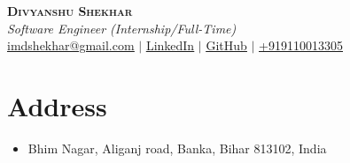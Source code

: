 \documentclass[letterpaper,11pt]{article}
\makeatletter
\newcommand{\resumeItem}[1]{
  \item\small{
    {#1 \vspace{-2pt}}
  }
}
\newcommand{\resumeSubheading}[4]{
  \vspace{-2pt}\item
    \begin{tabular*}{0.97\textwidth}[t]{l@{\extracolsep{\fill}}r}
      \textbf{#1} & #2 \\
      \textit{\small#3} & \textit{\small #4} \\
    \end{tabular*}\vspace{-7pt}
}
\newcommand{\resumeSubSubheading}[2]{
    \item
    \begin{tabular*}{0.97\textwidth}{l@{\extracolsep{\fill}}r}
      \textit{\small#1} & \textit{\small #2} \\
    \end{tabular*}\vspace{-7pt}
}
\newcommand{\resumeSubHeadingListStart}{\begin{itemize}[leftmargin=0.15in, label={}]}
\newcommand{\resumeSubHeadingListEnd}{\end{itemize}}
\newcommand{\resumeItemListStart}{\begin{itemize}}
\newcommand{\resumeItemListEnd}{\end{itemize}\vspace{-5pt}}
\newcommand{\role}[1]{\textit{\Large #1}}
\makeatother
\begin{document}

\begin{center}
    \textbf{\Huge \scshape Divyanshu Shekhar} \\ \vspace{2pt}
    \role{Software Engineer (Internship/Full-Time)} \\ \vspace{2pt}
    \href{mailto:imdshekhar@gmail.com}{ \underline{imdshekhar@gmail.com}} $|$  
    \href{https://linkedin.com/in/dshekhar17}{ \underline{LinkedIn}} $|$
    \href{https://github.com/divshekhar}{ \underline{GitHub}} $|$
    \href{tel:+919110013305} { \underline{+919110013305}}
\end{center}

\section{Address}
\begin{itemize}[leftmargin=0.15in, label={}]
    \item \small Bhim Nagar, Aliganj road, Banka, Bihar 813102, India
\end{itemize}

        
\end{document}
